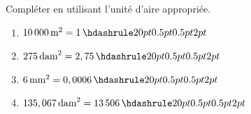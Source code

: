 \documentclass[exercice]{thedocument}%
\begin{document}
%
Compléter en utilisant l'unité d'aire appropriée.
\begin{enumerate}
    \item $10\,000\,\text{m}^2=1\,\doted{20pt}$
    \item $275\,\text{dam}^2=2,75\,\doted{20pt}$
    \item $6\,\text{mm}^2=0,0006\,\doted{20pt}$
    \item $135,067\,\text{dam}^2=13\,506\,\doted{20pt}$
\end{enumerate}
\end{document}
